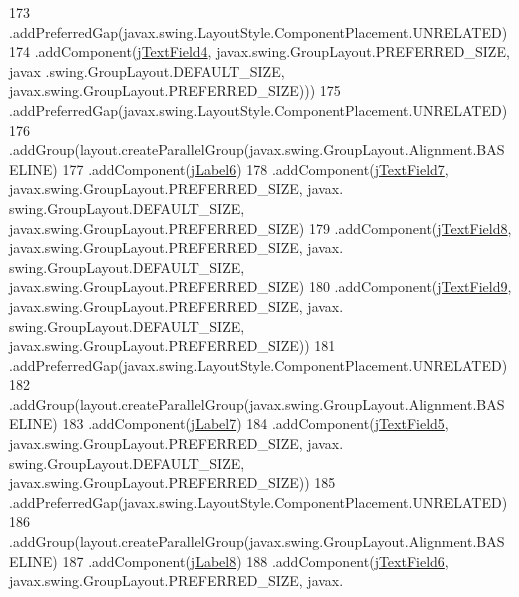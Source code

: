 \begin{DoxyCode}
173                         .addPreferredGap(javax.swing.LayoutStyle.ComponentPlacement.UNRELATED)
174                         .addComponent(\mbox{\hyperlink{class_interfaz_package_1_1_alta_libro_lectura_a9270f2ef1de5103cae58610ae6f84a4e}{jTextField4}}, javax.swing.GroupLayout.PREFERRED\_SIZE, javax
      .swing.GroupLayout.DEFAULT\_SIZE, javax.swing.GroupLayout.PREFERRED\_SIZE)))
175                 .addPreferredGap(javax.swing.LayoutStyle.ComponentPlacement.UNRELATED)
176                 .addGroup(layout.createParallelGroup(javax.swing.GroupLayout.Alignment.BASELINE)
177                     .addComponent(\mbox{\hyperlink{class_interfaz_package_1_1_alta_libro_lectura_adad4d61512f9ca3dc3fb3276975ac720}{jLabel6}})
178                     .addComponent(\mbox{\hyperlink{class_interfaz_package_1_1_alta_libro_lectura_a36a5981735d729d529ba7e20cb9182da}{jTextField7}}, javax.swing.GroupLayout.PREFERRED\_SIZE, javax.
      swing.GroupLayout.DEFAULT\_SIZE, javax.swing.GroupLayout.PREFERRED\_SIZE)
179                     .addComponent(\mbox{\hyperlink{class_interfaz_package_1_1_alta_libro_lectura_a3d4c846fbcd44478ef1bb950c38d6f57}{jTextField8}}, javax.swing.GroupLayout.PREFERRED\_SIZE, javax.
      swing.GroupLayout.DEFAULT\_SIZE, javax.swing.GroupLayout.PREFERRED\_SIZE)
180                     .addComponent(\mbox{\hyperlink{class_interfaz_package_1_1_alta_libro_lectura_aac3e23145bb542e8d96109c1ab458fa1}{jTextField9}}, javax.swing.GroupLayout.PREFERRED\_SIZE, javax.
      swing.GroupLayout.DEFAULT\_SIZE, javax.swing.GroupLayout.PREFERRED\_SIZE))
181                 .addPreferredGap(javax.swing.LayoutStyle.ComponentPlacement.UNRELATED)
182                 .addGroup(layout.createParallelGroup(javax.swing.GroupLayout.Alignment.BASELINE)
183                     .addComponent(\mbox{\hyperlink{class_interfaz_package_1_1_alta_libro_lectura_a35314814f07024c5ef5f0afa592a502f}{jLabel7}})
184                     .addComponent(\mbox{\hyperlink{class_interfaz_package_1_1_alta_libro_lectura_a9780c336f84357f6c171a8ccd8f8a94b}{jTextField5}}, javax.swing.GroupLayout.PREFERRED\_SIZE, javax.
      swing.GroupLayout.DEFAULT\_SIZE, javax.swing.GroupLayout.PREFERRED\_SIZE))
185                 .addPreferredGap(javax.swing.LayoutStyle.ComponentPlacement.UNRELATED)
186                 .addGroup(layout.createParallelGroup(javax.swing.GroupLayout.Alignment.BASELINE)
187                     .addComponent(\mbox{\hyperlink{class_interfaz_package_1_1_alta_libro_lectura_a04a4898900537bec80bdc4e81d5c41cf}{jLabel8}})
188                     .addComponent(\mbox{\hyperlink{class_interfaz_package_1_1_alta_libro_lectura_a064748cc16381a3773e64995629181b2}{jTextField6}}, javax.swing.GroupLayout.PREFERRED\_SIZE, javax.

\end{DoxyCode}
